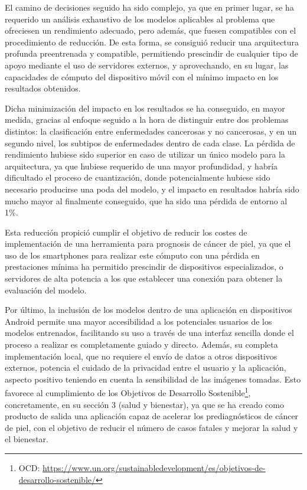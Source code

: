  El camino de decisiones seguido ha sido complejo, ya que en primer lugar, se ha requerido un análisis exhaustivo de los modelos aplicables al problema que ofreciesen un rendimiento adecuado, pero además, que fuesen compatibles con el procedimiento de reducción. De esta forma, se consiguió reducir una arquitectura profunda preentrenada y compatible, permitiendo prescindir de cualquier tipo de apoyo mediante el uso de servidores externos, y aprovechando, en su lugar, las capacidades de cómputo del dispositivo móvil con el mínimo impacto en los resultados obtenidos.

Dicha minimización del impacto en los resultados se ha conseguido, en mayor medida, gracias al enfoque seguido a la hora de distinguir entre dos problemas distintos: la clasificación entre enfermedades cancerosas y no cancerosas, y en un segundo nivel, los subtipos de enfermedades dentro de cada clase. La pérdida de rendimiento hubiese sido superior en caso de utilizar un único modelo para la arquitectura, ya que hubiese requerido de una mayor profundidad, y habría dificultado el proceso de cuantización, donde potencialmente hubiese sido necesario producirse una poda del modelo, y el impacto en resultados habría sido mucho mayor al finalmente conseguido, que ha sido una pérdida de entorno al 1\%. 

Esta reducción propició cumplir el objetivo de reducir los costes de implementación de una herramienta para prognosis de cáncer de piel, ya que el uso de los smartphones para realizar este cómputo con una pérdida en prestaciones mínima ha permitido prescindir de dispositivos especializados, o servidores de alta potencia a los que establecer una conexión para obtener la evaluación del modelo. 

Por último, la inclusión de los modelos dentro de una aplicación en dispositivos Android permite una mayor accesibilidad a los potenciales usuarios de los modelos entrenados, facilitando su uso a través de una interfaz sencilla donde el proceso a realizar es completamente guiado y directo. Además, su completa implementación local, que no requiere el envío de datos a otros dispositivos externos, potencia el cuidado de la privacidad entre el usuario y la aplicación, aspecto positivo teniendo en cuenta la sensibilidad de las imágenes tomadas. Esto favorece al cumplimiento de los Objetivos de Desarrollo Sostenible\footnote{OCD: \url{ https://www.un.org/sustainabledevelopment/es/objetivos-de-desarrollo-sostenible/}}, concretamente, en su sección 3 (salud y bienestar), ya que se ha creado como producto de salida una aplicación capaz de acelerar los prediagnósticos de cáncer de piel, con el objetivo de reducir el número de casos fatales y mejorar la salud y el bienestar.

